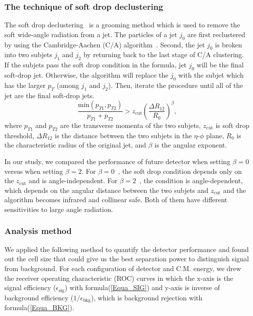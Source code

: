 \documentclass[12pt,twoside,a4paper,an,final]{cms-tdr}
\begin{document}
\subsubsection{The technique of soft drop declustering}
The soft drop declustering~\cite{Larkoski:2014wba} is a grooming method 
which is used to remove the soft wide-angle radiation from a jet. The particles of a jet 
$j_0$ are first reclustered by using the Cambridge-Aachen
 (C/A) algorithm~\cite{Dokshitzer:1997in,Wobisch:1998wt}. Second, the jet $j_0$ 
is broken into two subjets $j_1$ and $j_2$ by returning back to the last stage of C/A 
clustering.
If the subjets pass the soft drop condition in the formula, jet $j_0$ will be the final 
soft-drop jet. Otherwise, the algorithm will replace the $j_0$ with the subjet which has the 
larger $p_T$ (among $j_1$ and $j_2$). Then, iterate the procedure until all of the jet are the final soft-drop jets.
\begin{equation} \label{eq:soft-drop}
\frac{\mathrm{min}(p_{T1},p_{T2})}{p_{T1}+p_{T2}}>z_\mathrm{cut}(\frac{\Delta R_{12}}{R_{0}})^{\beta},
\end{equation}
where $p_{T1}$ and $p_{T2}$ are the transverse momenta of the two subjets, 
$z_\mathrm{cut}$ is soft drop threshold, 
$\Delta R_{12}$ is the distance between the two subjets in the $\eta$-$\phi$ 
plane, $R_0$ is the characteristic radius of the original jet, and $\beta$ is 
the angular exponent.

In our study, we compared the performance of future detector when setting 
$\beta=0$ versus when setting $\beta=2$. For $\beta=0$~\cite{CMS:2017wyc,Tripathee:2017ybi}, the soft drop condition 
depends only on the $z_\mathrm{cut}$ and is angle-independent. For $\beta=2$~\cite{Aaboud:2017qwh}, the condition is angle-dependent, which depends on 
the angular distance between the two subjets and $z_\mathrm{cut}$ and the 
algorithm becomes infrared and collinear safe. Both of them have different sensitivities to large angle radiation.

\subsubsection{Analysis method}\label{Analysis_method}
We applied the following method to quantify the detector performance and 
found out the cell size that could give us the best separation power to distinguish 
signal from background. For each configuration of detector and C.M. energy, 
we drew the receiver operating characteristic (ROC) curves in which the x-axis
 is the signal efficiency ($\epsilon_\mathrm{sig}$) with formula(\ref{Equa_SIG}) and y-axis is inverse 
of background efficiency ($1/\epsilon_\mathrm{bkg}$), which is background rejection with formula(\ref{Equa_BKG}). \\
\end{document}
